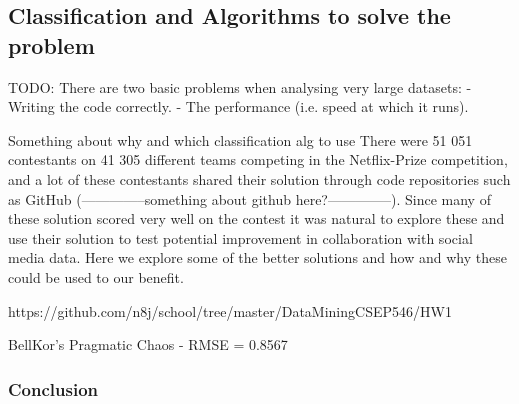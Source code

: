 \subsection{Classification and Algorithms to solve the problem}


TODO:
There are two basic problems when analysing very large datasets:
    - Writing the code correctly.
    - The performance (i.e. speed at which it runs).


Something about why and which classification alg to use
There were 51 051 contestants on 41 305 different teams competing in the Netflix-Prize competition, and a lot of these contestants shared their solution through code repositories such as GitHub (--------------something about github here?--------------). Since many of these solution scored very well on the contest it was natural to explore these and use their solution to test potential improvement in collaboration with social media data.
Here we explore some of the better solutions and how and why these could be used to our benefit.

https://github.com/n8j/school/tree/master/DataMiningCSEP546/HW1



BellKor's Pragmatic Chaos - RMSE = 0.8567
\subsubsection{Conclusion}




